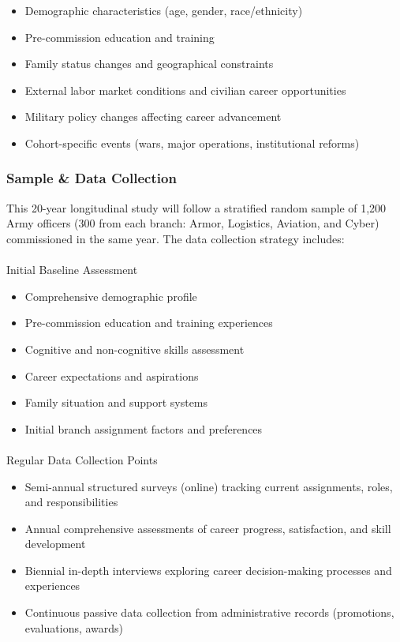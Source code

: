 \documentclass[
  letterpaper,
  DIV=11,
  numbers=noendperiod]{scrartcl}
\makeatletter
\let\oldparagraph\paragraph
\renewcommand{\paragraph}{
    \@ifstar
      \xxxParagraphStar
      \xxxParagraphNoStar
  }
\newcommand{\xxxParagraphStar}[1]{\oldparagraph*{#1}\mbox{}}
\newcommand{\xxxParagraphNoStar}[1]{\oldparagraph{#1}\mbox{}}
\providecommand{\tightlist}{%
  \setlength{\itemsep}{0pt}\setlength{\parskip}{0pt}}
\makeatother
\begin{document}
\begin{itemize}
\tightlist
\item
  Demographic characteristics (age, gender, race/ethnicity)
\item
  Pre-commission education and training
\item
  Family status changes and geographical constraints
\item
  External labor market conditions and civilian career opportunities
\item
  Military policy changes affecting career advancement
\item
  Cohort-specific events (wars, major operations, institutional reforms)
\end{itemize}

\subsubsection{Sample \& Data Collection}\label{sample-data-collection}

This 20-year longitudinal study will follow a stratified random sample
of 1,200 Army officers (300 from each branch: Armor, Logistics,
Aviation, and Cyber) commissioned in the same year. The data collection
strategy includes:

\paragraph{Initial Baseline
Assessment}\label{initial-baseline-assessment}

\begin{itemize}
\tightlist
\item
  Comprehensive demographic profile
\item
  Pre-commission education and training experiences
\item
  Cognitive and non-cognitive skills assessment
\item
  Career expectations and aspirations
\item
  Family situation and support systems
\item
  Initial branch assignment factors and preferences
\end{itemize}

\paragraph{Regular Data Collection
Points}\label{regular-data-collection-points}

\begin{itemize}
\tightlist
\item
  Semi-annual structured surveys (online) tracking current assignments,
  roles, and responsibilities
\item
  Annual comprehensive assessments of career progress, satisfaction, and
  skill development
\item
  Biennial in-depth interviews exploring career decision-making
  processes and experiences
\item
  Continuous passive data collection from administrative records
  (promotions, evaluations, awards)
\end{itemize}
\end{document}
